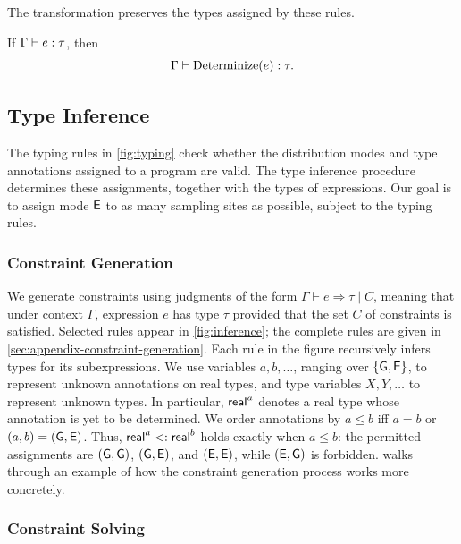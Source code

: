 The transformation preserves the types assigned by these rules.

\begin{lemma}
\label{lem:appendix-determinization-typing}
If $\Gamma\vdash e:\tau$, then
\[
  \Gamma\vdash \operatorname{Determinize}(e):\tau.
\]
\end{lemma}

\subsection{Type Inference}
\label{sec:type-inference}

The typing rules in \cref{fig:typing} check whether the distribution modes and type annotations assigned to a program are valid. The type inference procedure determines these assignments, together with the types of expressions. Our goal is to assign mode $\mathsf{E}$ to as many sampling sites as possible, subject to the typing rules.

\subsubsection{Constraint Generation}



We generate constraints using judgments of the form
$\Gamma\vdash e\Rightarrow\tau\mid C$, meaning that under context
$\Gamma$, expression $e$ has type $\tau$ provided that the set
$C$ of constraints is satisfied. Selected rules appear in \cref{fig:inference}; the complete rules
are given in \cref{sec:appendix-constraint-generation}. Each rule in the figure recursively infers types for its subexpressions.
We use variables $a,b,\ldots$, ranging over $\{\mathsf{G},\mathsf{E}\}$,
to represent unknown annotations on real types, and type variables
$X,Y,\ldots$ to represent unknown types.
In particular, $\mathsf{real}^{a}$ denotes a real type whose annotation is yet
to be determined. We order annotations by $a\le b$ iff $a=b$ or
$(a,b)=(\mathsf{G},\mathsf{E})$. Thus,
$\mathsf{real}^{a}<:\mathsf{real}^{b}$ holds exactly when $a\le b$:
the permitted assignments are $(\mathsf{G},\mathsf{G})$, $(\mathsf{G},\mathsf{E})$,
and $(\mathsf{E},\mathsf{E})$, while $(\mathsf{E},\mathsf{G})$ is forbidden.  walks through an example of how the constraint generation process works more concretely. 

\subsubsection{Constraint Solving}

